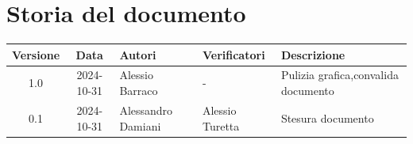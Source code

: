 \section{Storia del documento}
\begin{tabularx}{\textwidth}{ c c p{3.2cm} p{3.17cm} X }
    \rowcolor{gray!20}\rule{0pt}{0.5cm}\textbf{Versione} & \textbf{Data} & \textbf{Autori} & \textbf{Verificatori} & \textbf{Descrizione} \\[0.7ex]
    \hline
    \rule{0pt}{0.5cm}1.0 & 2024-10-31 & Alessio Barraco &  - & Pulizia grafica,\newline convalida documento\\[3.5ex]
    \hline
    \rule{0pt}{0.5cm}0.1 & 2024-10-31 & Alessandro Damiani & Alessio Turetta & Stesura documento\\[0.7ex] 
\end{tabularx}